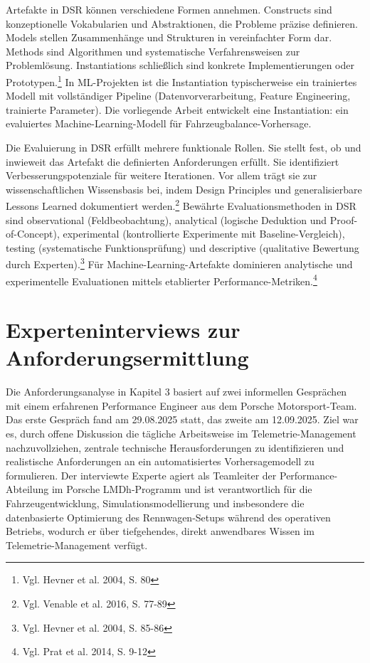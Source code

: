 Artefakte in \ac{DSR} können verschiedene Formen annehmen. Constructs sind konzeptionelle Vokabularien und Abstraktionen, die Probleme präzise definieren. Models stellen Zusammenhänge und Strukturen in vereinfachter Form dar. Methods sind Algorithmen und systematische Verfahrensweisen zur Problemlösung. Instantiations schließlich sind konkrete Implementierungen oder Prototypen.\footnote{Vgl. Hevner et al. 2004, S. 80} In ML-Projekten ist die Instantiation typischerweise ein trainiertes Modell mit vollständiger Pipeline (Datenvorverarbeitung, Feature Engineering, trainierte Parameter). Die vorliegende Arbeit entwickelt eine Instantiation: ein evaluiertes Machine-Learning-Modell für Fahrzeugbalance-Vorhersage.

Die Evaluierung in \ac{DSR} erfüllt mehrere funktionale Rollen. Sie stellt fest, ob und inwieweit das Artefakt die definierten Anforderungen erfüllt. Sie identifiziert Verbesserungspotenziale für weitere Iterationen. Vor allem trägt sie zur wissenschaftlichen Wissensbasis bei, indem Design Principles und generalisierbare Lessons Learned dokumentiert werden.\footnote{Vgl. Venable et al. 2016, S. 77-89} Bewährte Evaluationsmethoden in \ac{DSR} sind observational (Feldbeobachtung), 
analytical (logische Deduktion und Proof-of-Concept), experimental 
(kontrollierte Experimente mit Baseline-Vergleich), testing (systematische 
Funktionsprüfung) und descriptive (qualitative Bewertung durch Experten).\footnote{Vgl. 
Hevner et al. 2004, S. 85-86} Für Machine-Learning-Artefakte dominieren 
analytische und experimentelle Evaluationen mittels etablierter Performance-Metriken.\footnote{Vgl. 
Prat et al. 2014, S. 9-12}


\section{Experteninterviews zur Anforderungsermittlung}

Die Anforderungsanalyse in Kapitel 3 basiert auf zwei informellen Gesprächen mit einem erfahrenen Performance Engineer aus dem Porsche Motorsport-Team. Das erste Gespräch fand am 29.08.2025 statt, das zweite am 12.09.2025. Ziel war es, durch offene Diskussion die tägliche Arbeitsweise im Telemetrie-Management nachzuvollziehen, zentrale technische Herausforderungen zu identifizieren und realistische Anforderungen an ein automatisiertes Vorhersagemodell zu formulieren.
Der interviewte Experte agiert als Teamleiter der Performance-Abteilung im Porsche LMDh-Programm und ist verantwortlich für die Fahrzeugentwicklung, Simulationsmodellierung und insbesondere die datenbasierte Optimierung des Rennwagen-Setups während des operativen Betriebs, wodurch er über tiefgehendes, direkt anwendbares Wissen im Telemetrie-Management verfügt.

